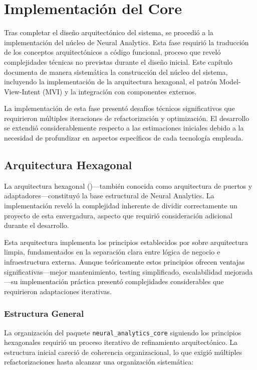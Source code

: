 \chapter{Implementación del Core}\label{ch:core_implementing}

Tras completar el diseño arquitectónico del sistema, se procedió a la implementación del núcleo de Neural Analytics. Esta fase requirió la traducción de los conceptos arquitectónicos a código funcional, proceso que reveló complejidades técnicas no previstas durante el diseño inicial. Este capítulo documenta de manera sistemática la construcción del núcleo del sistema, incluyendo la implementación de la arquitectura hexagonal, el patrón Model-View-Intent (MVI) y la integración con componentes externos.

La implementación de esta fase presentó desafíos técnicos significativos que requirieron múltiples iteraciones de refactorización y optimización. El desarrollo se extendió considerablemente respecto a las estimaciones iniciales debido a la necesidad de profundizar en aspectos específicos de cada tecnología empleada.

\section{Arquitectura Hexagonal}

La arquitectura hexagonal (\citeyear{martin2017clean})—también conocida como arquitectura de puertos y adaptadores—constituyó la base estructural de Neural Analytics. La implementación reveló la complejidad inherente de dividir correctamente un proyecto de esta envergadura, aspecto que requirió consideración adicional durante el desarrollo.

Esta arquitectura implementa los principios establecidos por  sobre arquitectura limpia, fundamentados en la separación clara entre lógica de negocio e infraestructura externa. Aunque teóricamente estos principios ofrecen ventajas significativas—mejor mantenimiento, testing simplificado, escalabilidad mejorada—su implementación práctica presentó complejidades considerables que requirieron adaptaciones iterativas.

\subsection{Estructura General}

La organización del paquete \texttt{neural\_analytics\_core} siguiendo los principios hexagonales requirió un proceso iterativo de refinamiento arquitectónico. La estructura inicial careció de coherencia organizacional, lo que exigió múltiples refactorizaciones hasta alcanzar una organización sistemática:

